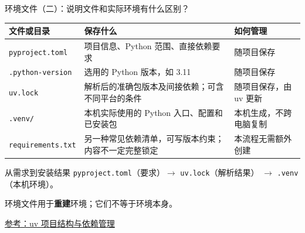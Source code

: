 \documentclass[9pt]{ctexbeamer}
\begin{document}
\begin{frame}{环境文件（二）：说明文件和实际环境有什么区别？}
  \small
  \begin{tabular}{p{}p{}p{}}
    \toprule
    文件或目录 & 保存什么 & 如何管理 \\
    \midrule
    \texttt{pyproject.toml} & 项目信息、Python 范围、直接依赖要求 & 随项目保存 \\[7pt]
    \texttt{.python-version} & 选用的 Python 版本，如 3.11 & 随项目保存 \\[7pt]
    \texttt{uv.lock} & 解析后的准确包版本及间接依赖；可含不同平台的条件 & 随项目保存，由 uv 更新 \\[7pt]
    \texttt{.venv/} & 本机实际使用的 Python 入口、配置和已安装包 & 本机生成，不跨电脑复制 \\[7pt]
    \texttt{requirements.txt} & 另一种常见依赖清单，可写版本约束；内容不一定完整锁定 & 本流程无需额外创建 \\
    \bottomrule
  \end{tabular}
  \vspace{0.3cm}
  \begin{block}{从需求到安装结果}
    \texttt{pyproject.toml}（要求）$\rightarrow$ \texttt{uv.lock}（解析结果）
    $\rightarrow$ \texttt{.venv}（本机环境）。\par
    环境文件用于\textbf{重建}环境；它们不等于环境本身。
  \end{block}
  {\tiny\href{https://docs.astral.sh/uv/guides/projects/}{参考：uv 项目结构与依赖管理}}
\end{frame}
\end{document}
